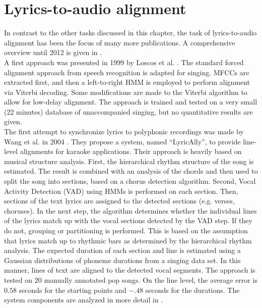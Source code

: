 \section{Lyrics-to-audio alignment}
In contrast to the other tasks discussed in this chapter, the task of lyrics-to-audio alignment has been the focus of many more publications. A comprehensive overview until 2012 is given in \cite{goto_alignment}.\\
A first approach was presented in 1999 by Loscos et al. \cite{loscos}. The standard forced alignment approach from speech recognition is adapted for singing. MFCCs are extracted first, and then a left-to-right HMM is employed to perform alignment via Viterbi decoding. Some modifications are made to the Viterbi algorithm to allow for low-delay alignment. The approach is trained and tested on a very small (22 minutes) database of unaccompanied singing, but no quantitative results are given.\\
The first attempt to synchronize lyrics to polyphonic recordings was made by Wang et al. in 2004 \cite{Wang2004}. They propose a system, named ``LyricAlly'', to provide line-level alignments for karaoke applications. Their approach is heavily based on musical structure analysis. First, the hierarchical rhythm structure of the song is estimated. The result is combined with an analysis of the chords and then used to split the song into sections, based on a chorus detection algorithm. Second, Vocal Activity Detection (VAD) using HMMs is performed on each section. Then, sections of the text lyrics are assigned to the detected sections (e.g. verses, choruses). In the next step, the algorithm determines whether the individual lines of the lyrics match up with the vocal sections detected by the VAD step. If they do not, grouping or partitioning is performed. This is based on the assumption that lyrics match up to rhythmic bars as determined by the hierarchical rhythm analysis. The expected duration of each section and line is estimated using a Gaussian distributions of phoneme durations from a singing data set. In this manner, lines of text are aligned to the detected vocal segments. The approach is tested on 20 manually annotated pop songs. On the line level, the average error is $0.58$ seconds for the starting points and $-.48$ seconds for the durations. The system components are analyzed in more detail in \cite{lyrically}.\\
